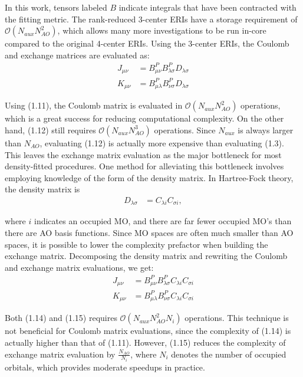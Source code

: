 \noindent In this work, tensors labeled $B$ indicate integrals that have been contracted with the fitting metric.
The rank-reduced 3-center ERIs have a storage requirement of $\mathcal{O}(N_{aux}N_{AO}^2)$, 
which allows many more investigations to be run in-core compared to the original 4-center ERIs. 
Using the 3-center ERIs, the Coulomb and exchange matrices are evaluated as: 
\begin{align}
J_{\mu \nu} &= B_{\mu \nu}^P B_{\lambda \sigma}^PD_{\lambda \sigma} \\
K_{\mu \nu} &= B_{\mu \lambda}^P B_{\nu \sigma}^PD_{\lambda \sigma}
\end{align}

\noindent Using (1.11), the Coulomb matrix is evaluated in $\mathcal{O}(N_{aux}N_{AO}^2)$ operations, which is a great success
for reducing computational complexity. On the other hand, (1.12) still requires $\mathcal{O}(N_{aux}N_{AO}^3)$ operations. 
Since $N_{aux}$ is always larger than $N_{AO}$, evaluating (1.12) is actually more expensive than evaluating (1.3).
This leaves the exchange matrix evaluation as the major bottleneck for most density-fitted procedures.
One method for alleviating this bottleneck involves employing knowledge 
of the form of the density matrix. In Hartree-Fock theory, the density matrix is 
\begin{align}
D_{\lambda \sigma} &= C_{\lambda i}C_{\sigma i},
\end{align}

\noindent where $i$ indicates an occupied MO, and there are far fewer occupied MO's than there are AO basis functions.
\noindent Since MO spaces are often much smaller than AO spaces, it is possible to lower the complexity prefactor when 
building the exchange matrix. 
Decomposing the density matrix and rewriting the Coulomb and exchange matrix evaluations, we get:
\begin{align}
J_{\mu \nu} &= B_{\mu \nu}^P B_{\lambda \sigma}^PC_{\lambda i}C_{\sigma i} \\
K_{\mu \nu} &= B_{\mu \lambda}^P B_{\nu \sigma}^PC_{\lambda i}C_{\sigma i}
\end{align}

\noindent Both (1.14) and (1.15) requires $\mathcal{O}(N_{aux}N_{AO}^2N_i)$ operations.
This technique is not beneficial for Coulomb matrix evaluations, since the complexity of (1.14) is actually
higher than that of (1.11). However, (1.15) reduces the complexity of exchange matrix evaluation by  
$\frac{N_{AO}}{N_i}$, where $N_i$ denotes the number of occupied orbitals, which provides moderate speedups in practice.

